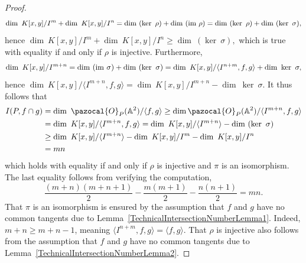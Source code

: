 \begin{proof}
        $$\dim\ K[x,y]/I^m +\dim\ K[x,y]/I^n = \dim\ (\ker \ \rho) + \dim \ (\im \ \rho)= \dim\ (\ker \ \rho) + \dim \ (\ker \ \sigma),$$
        hence $\dim\ K[x,y]/I^m +\dim\ K[x,y]/I^n \geq \dim \ (\ker \ \sigma),$ which is true with equality if and only if $\rho$ is injective. Furthermore, 
        $$\dim \ K[x,y]/I^{m+n} = \dim\ (\im \ \sigma)+ \dim\ (\ker \ \sigma)= \dim\ K[x,y]/\langle I^{n+m}, f,g\rangle +\dim \ \ker \ \sigma,$$
        hence $\dim \ K[x,y]/\langle I^{m+n},f,g\rangle =\dim \ K[x,y]/I^{m+n} - \dim\ \ker \ \sigma$. It thus follows that 
        \begin{align*}
            I(P,f\cap g) &= \dim \ \pazocal{O}_P(\A^2)/\langle f,g\rangle \geq \dim \pazocal{O}_P(\A^2)/\langle I^{m+n},f,g\rangle\\
            &=\dim \ K[x,y]/\langle I^{m+n},f,g\rangle = \dim\ K[x,y]/\langle I^{m+n}\rangle- \dim \ (\ker \ \sigma)\\
            &\geq \dim\ K[x,y]/\langle I^{m+n}\rangle- \dim \ K[x,y]/I^{m}-\dim\ K[x,y]/I^n\\
            &= mn
        \end{align*}
        which holds with equality if and only if $\rho$ is injective and $\pi$ is an isomorphism. The last equality follows from verifying the computation,
        $$\frac{(m+n)(m+n+1)}{2}- \frac{m(m+1)}{2}-\frac{n(n+1)}{2} = mn.$$
        That $\pi$ is an isomorphism is ensured by the assumption that $f$ and $g$ have no common tangents due to Lemma~\ref{TechnicalIntersectionNumberLemma1}. Indeed, $m+n\geq m+n-1$, meaning $\langle I^{n+m},f,g\rangle= \langle f,g\rangle$. That $\rho$ is injective also follows from the assumption that $f$ and $g$ have no common tangents due to Lemma~\ref{TechnicalIntersectionNumberLemma2}.  
    \end{proof}
